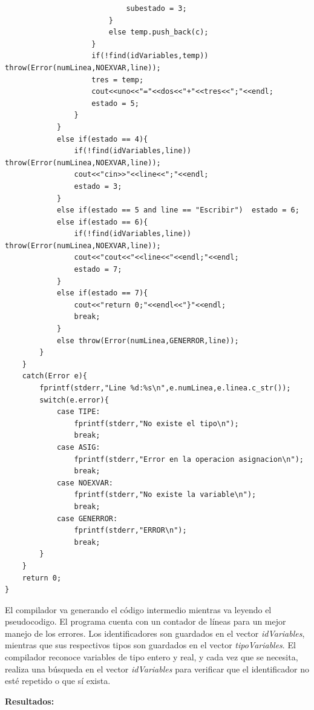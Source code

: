 \documentclass[a4paper,12pt]{article}
\begin{document}
\begin{lstlisting}
							subestado = 3;
						}
						else temp.push_back(c);
					}
					if(!find(idVariables,temp)) throw(Error(numLinea,NOEXVAR,line));
					tres = temp;
					cout<<uno<<"="<<dos<<"+"<<tres<<";"<<endl;
					estado = 5;
				}
			}
			else if(estado == 4){
				if(!find(idVariables,line)) throw(Error(numLinea,NOEXVAR,line));
				cout<<"cin>>"<<line<<";"<<endl;
				estado = 3;
			}
			else if(estado == 5 and line == "Escribir")  estado = 6;
			else if(estado == 6){
				if(!find(idVariables,line)) throw(Error(numLinea,NOEXVAR,line));
				cout<<"cout<<"<<line<<"<<endl;"<<endl;
				estado = 7;
			}
			else if(estado == 7){
				cout<<"return 0;"<<endl<<"}"<<endl;
				break;
			}
			else throw(Error(numLinea,GENERROR,line));
		}
	}
	catch(Error e){
		fprintf(stderr,"Line %d:%s\n",e.numLinea,e.linea.c_str());
		switch(e.error){
			case TIPE:
				fprintf(stderr,"No existe el tipo\n");
				break;
			case ASIG:
				fprintf(stderr,"Error en la operacion asignacion\n");
				break;
			case NOEXVAR:
				fprintf(stderr,"No existe la variable\n");
				break;
			case GENERROR:
				fprintf(stderr,"ERROR\n");
				break;
		}
	}
	return 0;
}
\end{lstlisting}

El compilador va generando el código intermedio mientras va leyendo el pseudocodigo. El programa cuenta con un contador de líneas para un mejor manejo de los errores. Los identificadores son guardados en el vector \textit{idVariables}, mientras que
sus respectivos tipos son guardados en el vector \textit{tipoVariables}. El compilador reconoce variables de tipo entero y real, y cada vez que se necesita, realiza una
búsqueda en el vector \textit{idVariables} para verificar que el identificador no esté repetido o que sí exista.

\textbf{Resultados:}
\end{document}
